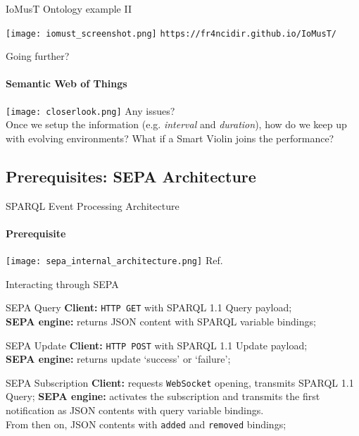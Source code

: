 \documentclass{beamer}
\begin{document}
\begin{frame}{IoMusT Ontology example II}

\end{frame}

\begin{frame}
\texttt{[image: iomust\_screenshot.png]}
\texttt{https://fr4ncidir.github.io/IoMusT/}
\end{frame}

\begin{frame}{Going further?}
\framesubtitle{Semantic Web of Things}
\texttt{[image: closerlook.png]}
\normalsize
Any issues? \\ \pause
Once we setup the information (e.g. \textit{interval} and \textit{duration}), how do we keep up with evolving environments? What if a Smart Violin joins the performance?
\end{frame}

\subsection{Prerequisites: SEPA Architecture}
\begin{frame}{SPARQL Event Processing Architecture}
\framesubtitle{Prerequisite}
\texttt{[image: sepa\_internal\_architecture.png]}
\footnotesize{Ref. \cite{roffia2018dynamic}}
\normalsize
\end{frame}
\begin{frame}{Interacting through SEPA}
\begin{block}{SEPA Query}
\textbf{Client:} \texttt{HTTP GET} with SPARQL 1.1 Query payload;\\
\textbf{SEPA engine:} returns JSON content with SPARQL variable bindings;
\end{block} \pause

\begin{block}{SEPA Update}
\textbf{Client:} \texttt{HTTP POST} with SPARQL 1.1 Update payload;\\
\textbf{SEPA engine:} returns update `success' or `failure';
\end{block} \pause

\begin{block}{SEPA Subscription}
\textbf{Client:} requests \texttt{WebSocket} opening, transmits SPARQL 1.1 Query;
\textbf{SEPA engine:} activates the subscription and transmits the first notification as JSON contents with query variable bindings. \\
From then on, JSON contents with \texttt{added} and \texttt{removed} bindings;
\end{block}
\end{frame}
\begin{frame}

\end{frame}
\end{document}
